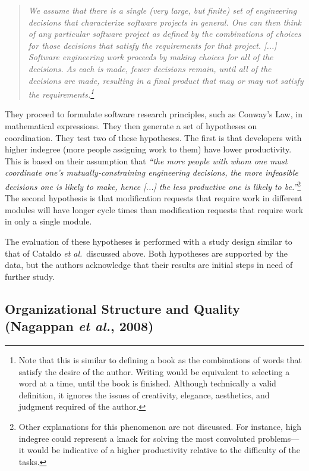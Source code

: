\begin{quote}
\emph{We assume that there is a single (very large, but finite) set of engineering decisions that characterize software projects in general. One can then think of any particular software project as defined by the combinations of choices for those decisions that satisfy the requirements for that project. [...] Software engineering work proceeds by making choices for all of the decisions. As each is made, fewer decisions remain, until all of the decisions are made, resulting in a final product that may or may not satisfy the requirements.\footnote{Note that this is similar to defining a book as the combinations of words that satisfy the desire of the author. Writing would be equivalent to selecting a word at a time, until the book is finished. Although technically a valid definition, it ignores the issues of creativity, elegance, aesthetics, and judgment required of the author.}}
\end{quote}

They proceed to formulate software research principles, such as Conway's Law, in mathematical expressions. They then generate a set of hypotheses on coordination. They test two of these hypotheses. The first is that developers with higher indegree (more people assigning work to them) have lower productivity. This is based on their assumption that \emph{``the more people with whom one must coordinate one's mutually-constraining engineering decisions, the more infeasible decisions one is likely to make, hence [...] the less productive one is likely to be.''}\footnote{Other explanations for this phenomenon are not discussed. For instance, high indegree could represent a knack for solving the most convoluted problems---it would be indicative of a higher productivity relative to the difficulty of the tasks.} The second hypothesis is that modification requests that require work in different modules will have longer cycle times than modification requests that require work in only a single module.

The evaluation of these hypotheses is performed with a study design similar to that of Cataldo \emph{et al.}\ discussed above. Both hypotheses are supported by the data, but the authors acknowledge that their results are initial steps in need of further study.

\subsection{Organizational Structure and Quality (Nagappan \emph{et al.}, 2008)}

